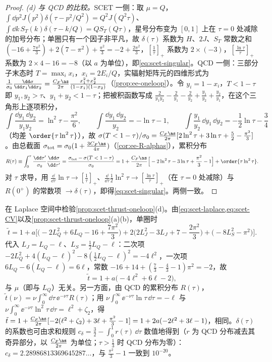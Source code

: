 \begin{proof}
\emph{(d) 与 QCD 的比较。}SCET 一侧：取 $\mu=Q$，$\int\dd p^2J(p^2)\delta(\tau-p^2/Q^2)=Q^2J(Q^2\tau)$、$\int\dd k\,S_T(k)\delta(\tau-k/Q)=QS_T(Q\tau)$，星号分布变为 $[0,1]$ 上在 $\tau=0$ 处减除的加号分布；单圈只有一个因子非平凡，故 $\delta(\tau)$ 系数为 $H$、$2J$、$S_T$ 常数之和 $(-16+\frac{7\pi^2}3)+2(7-\pi^2)+\frac{\pi^2}3=-2+\frac{2\pi^2}{3}$，$[\frac1\tau]_+$ 系数为 $2\times(-3)$，$[\frac{\ln\tau}\tau]_+$ 系数为 $2\times4-16=-8$（以 $a$ 为单位），即\cref{eq:scet-singular}。QCD 一侧：三部分子末态时 $T=\max_ix_i$，$x_i=2E_i/Q$，实辐射矩阵元的四维形式为 $\frac1{\sigma_0}\frac{\dd\sigma}{\dd x_1\dd x_2}=\frac{C_F\as}{2\pi}\frac{x_1^2+x_2^2}{(1-x_1)(1-x_2)}$（\cref{prop:ee-oneloop}）。令 $y_i=1-x_i$，$T<1-\tau$ 即 $y_1,y_2>\tau$、$y_1+y_2<1-\tau$；把被积函数写成 $\frac{2}{y_1y_2}-\frac2{y_1}-\frac2{y_2}+\frac{y_1}{y_2}+\frac{y_2}{y_1}$，在这个三角形上逐项积分，
\[
\int\frac{\dd y_1\,\dd y_2}{y_1y_2}=\ln^2\tau-\frac{\pi^2}6,\qquad\int\frac{\dd y_1\,\dd y_2}{y_2}=-\ln\tau-1,\qquad\int\frac{y_1}{y_2}\,\dd y_1\,\dd y_2=-\frac12\ln\tau-\frac34
\]
（均差 $\order{\tau\ln^2\tau}$），故 $\sigma(T<1-\tau)/\sigma_0=\frac{C_F\as}{2\pi}[2\ln^2\tau+3\ln\tau+\frac52-\frac{\pi^2}{3}]$。由总截面 $\sigma_{\rm tot}=\sigma_0(1+\frac{3C_F\as}{4\pi})$（\cref{cor:ee-R-alphas}），累积分布
\[
R(\tau)\equiv\int_0^\tau\frac{\dd\tau'}{\sigma_0}\frac{\dd\sigma}{\dd\tau'}=\frac{\sigma_{\rm tot}-\sigma(T<1-\tau)}{\sigma_0}=1+\frac{C_F\as}{2\pi}\Big[-2\ln^2\tau-3\ln\tau+\frac{\pi^2}{3}-1\Big]+\order{\tau\ln^2\tau}.
\]
对 $\tau$ 求导，用 $\frac{\dd}{\dd\tau}\ln\tau\to[\frac1\tau]_+$、$\frac{\dd}{\dd\tau}\frac12\ln^2\tau\to[\frac{\ln\tau}\tau]_+$（在 $\tau=0$ 处减除）与 $R(0^+)$ 的常数项 $\to\delta(\tau)$，即得\cref{eq:scet-singular}。两侧一致。
\end{proof}

\begin{example}\label{ex:scet-thrust-oneloop}
在 Laplace 空间中检验\cref{prop:scet-thrust-oneloop}(d)。由\cref{eq:scet-laplace,eq:scet-CV}以及\cref{prop:scet-thrust-oneloop}(a)(b)，单圈时
\[
\tilde t=1+a\Big[\Big(-2L_Q^2+6L_Q-16+\frac{7\pi^2}3\Big)+2\Big(2L_J^2-3L_J+7-\frac{2\pi^2}{3}\Big)+\big(-8L_S^2-\pi^2\big)\Big].
\]
代入 $L_J=L_Q-\ell$、$L_S=\frac12L_Q-\ell$：二次项 $-2L_Q^2+4(L_Q-\ell)^2-8(\frac12L_Q-\ell)^2=-4\ell^2$，一次项 $6L_Q-6(L_Q-\ell)=6\ell$，常数 $-16+14+(\frac73-\frac43-1)\pi^2=-2$，故
\[
\tilde t=1+a\big(-4\ell^2+6\ell-2\big),
\]
与 $\mu$（即与 $L_Q$）无关。另一方面，由 QCD 的累积分布 $R(\tau)$，$\tilde t(\nu)=\nu\int_0^\infty\dd\tau\,\ee^{-\nu\tau}R(\tau)$；用 $\nu\int_0^\infty\ee^{-\nu\tau}\ln\tau\,\dd\tau=-\ell$ 与 $\nu\int_0^\infty\ee^{-\nu\tau}\ln^2\tau\,\dd\tau=\ell^2+\zeta_2$，得 $\tilde t=1+\frac{C_F\as}{2\pi}[-2(\ell^2+\zeta_2)+3\ell+\frac{\pi^2}{3}-1]=1+2a(-2\ell^2+3\ell-1)$，相同。$\delta(\tau)$ 的系数也可由求和规则 $c_\delta=\frac32-\int_0^1r(\tau)\,\dd\tau$ 数值地得到（$r$ 为 QCD 分布减去其奇异部分，以 $\frac{C_F\as}{2\pi}$ 为单位；$\tau>\frac13$ 时 QCD 分布为零）：$c_\delta=2.28986813369645287\ldots$，与 $\frac{\pi^2}{3}-1$ 一致到 $10^{-20}$。%
\end{example}

